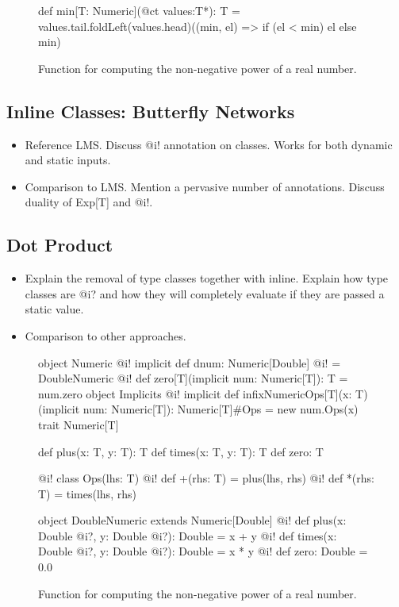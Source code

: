 \begin{figure}
\begin{listing}
def min[T: Numeric](@ct values:T*): T =
  values.tail.foldLeft(values.head)((min, el) => if (el < min) el else min)
\end{listing}
\caption{\label{lst:vector_deep_ir} Function for computing the non-negative power of a real number.}
\end{figure}



\subsection{Inline Classes: Butterfly Networks}
\begin{itemize}
  \item Reference LMS. Discuss @i! annotation on classes. Works for both dynamic and static inputs.
  \item Comparison to LMS. Mention a pervasive number of annotations. Discuss duality of Exp[T] and @i!.
\end{itemize}




\subsection{Dot Product}
\label{sct:dot-product}
\begin{itemize}
  \item Explain the removal of type classes together with inline. Explain how type classes
  are @i? and how they will completely evaluate if they are passed a static value.
  \item Comparison to other approaches.
\end{itemize}


\begin{figure}
\begin{listing}
object Numeric {
  @i! implicit def dnum: Numeric[Double] @i! = DoubleNumeric
  @i! def zero[T](implicit num: Numeric[T]): T = num.zero
  object Implicits {
    @i! implicit def infixNumericOps[T](x: T)(implicit num: Numeric[T]): Numeric[T]#Ops = new num.Ops(x)
  }
}
trait Numeric[T] {
  def plus(x: T, y: T): T
  def times(x: T, y: T): T
  def zero: T

  @i! class Ops(lhs: T) {
    @i! def +(rhs: T) = plus(lhs, rhs)
    @i! def *(rhs: T) = times(lhs, rhs)
  }
}

object DoubleNumeric extends Numeric[Double] {
  @i! def plus(x: Double @i?, y: Double @i?): Double = x + y
  @i! def times(x: Double @i?, y: Double @i?): Double = x * y
  @i! def zero: Double = 0.0
}
\end{listing}
\caption{\label{lst:vector_deep_ir} Function for computing the non-negative power of a real number.}
\end{figure}
